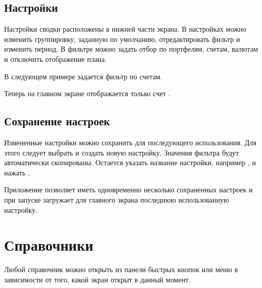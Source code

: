 \documentclass[a4paper,10pt,russian]{sphinxmanual}
\begin{document}
\section{Настройки}
\label{\detokenize{main-screen:id4}}
\sphinxAtStartPar
Настройки сводки расположены в нижней части экрана. В настройках можно изменить группировку, заданную по умолчанию,
отредактировать фильтр и изменить период. В фильтре можно задать отбор по портфелям, счетам, валютам и отключить
отображение плана.

\sphinxAtStartPar
В следующем примере задается фильтр по счетам.

\noindent{}
\noindent{}
\noindent{}
\noindent{}
\noindent{}
\noindent{}

\sphinxAtStartPar
Теперь на главном экране отображается только счет .


\section{Сохранение настроек}
\label{\detokenize{main-screen:id5}}
\sphinxAtStartPar
Измененные настройки можно сохранить для последующего использования. Для этого следует выбрать
 и создать новую настройку. Значения фильтра будут автоматически
скопированы. Остается указать название настройки, например , и
нажать .

\noindent{}
\noindent{}

\sphinxAtStartPar
Приложение позволяет иметь одновременно несколько сохраненных настроек и
при запуске загружает для главного экрана последнюю использованную настройку.

\sphinxstepscope


\chapter{Справочники}
\label{\detokenize{directories:chapter-directories}}\label{\detokenize{directories:id1}}\label{\detokenize{directories::doc}}
\sphinxAtStartPar
Любой справочник можно открыть из панели быстрых кнопок или меню  в зависимости от того,
какой экран открыт в данный момент.
\end{document}

